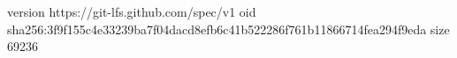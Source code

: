 version https://git-lfs.github.com/spec/v1
oid sha256:3f9f155c4e33239ba7f04dacd8efb6c41b522286f761b11866714fea294f9eda
size 69236
